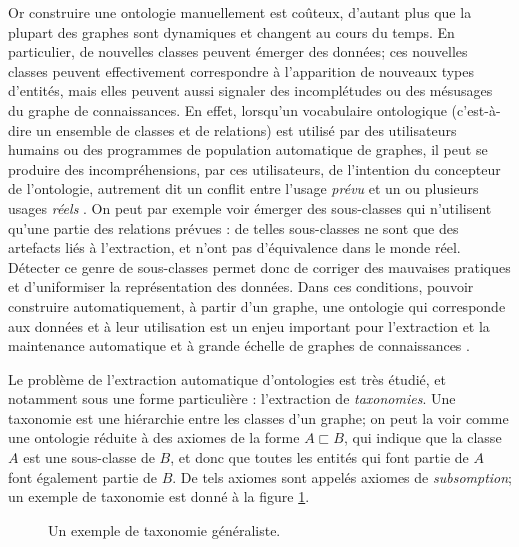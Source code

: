 Or construire une ontologie manuellement est coûteux, d'autant plus que la plupart des graphes sont dynamiques et changent au cours du temps. %
%
En particulier, de nouvelles classes peuvent émerger des données; ces nouvelles classes peuvent effectivement correspondre à l'apparition de nouveaux types d'entités, mais elles peuvent aussi signaler des incomplétudes ou des mésusages du graphe de connaissances.
En effet, lorsqu'un vocabulaire ontologique (c'est-à-dire un ensemble de classes et de relations) est utilisé par des utilisateurs humains ou des programmes de population automatique de graphes, il peut se produire des incompréhensions, par ces utilisateurs, de l'intention du concepteur de l'ontologie, autrement dit un conflit entre l'usage \textit{prévu} et un ou plusieurs usages \textit{réels} \cite{adrian2013inconsistency}. On peut par exemple voir émerger des sous-classes qui n'utilisent qu'une partie des relations prévues : de telles sous-classes ne sont que des artefacts liés à l'extraction, et n'ont pas d'équivalence dans le monde réel. Détecter ce genre de sous-classes permet donc de corriger des mauvaises pratiques et d'uniformiser la représentation des données. %
%
Dans ces conditions, pouvoir construire automatiquement, à partir d'un graphe, une ontologie qui corresponde aux données et à leur utilisation est un enjeu important pour l'extraction et la maintenance automatique et à grande échelle de graphes de connaissances \cite{zhou2007ontology}.

Le problème de l'extraction automatique d'ontologies est très étudié, et notamment sous une forme particulière : l'extraction de \textit{taxonomies}. Une taxonomie est une hiérarchie entre les classes d'un graphe; on peut la voir comme une ontologie réduite à des axiomes de la forme $A \sqsubset B$, qui indique que la classe $A$ est une sous-classe de $B$, et donc que toutes les entités qui font partie de $A$ font également partie de $B$. De tels axiomes sont appelés axiomes de \textit{subsomption}; un exemple de taxonomie est donné à la figure \ref{fig:intro-taxo}.

\begin{figure}[h]
    \centering
    
    \caption{Un exemple de taxonomie généraliste.}
    \label{fig:intro-taxo}
\end{figure}


